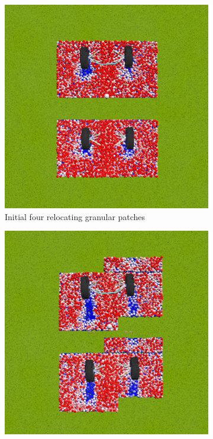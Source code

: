 \documentclass[12pt,onecolumn]{report}
\begin{document}
\begin{figure}
	\centering
	\begin{subfigure}[b]{0.32\textwidth}
		\centering
		\includegraphics[width=\linewidth]{Figs/4patch1.png}
		\caption{\small Initial four relocating granular patches}   
		\label{fig:4PatchA}
	\end{subfigure}
	\hfill
	\begin{subfigure}[b]{0.32\textwidth}
		\centering
		\includegraphics[width=\linewidth]{Figs/4patch2.png}

\end{subfigure}
\end{figure}
\end{document}
